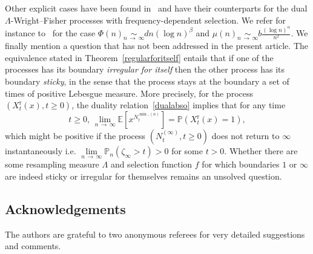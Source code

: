 \documentclass[AHL,Unicode,longabstracts,published]{cedram}
\newcommand{\rmr}{\mathrm{r}}
\newcommand{\bbE}{\mathbb{E}}
\newcommand{\bbP}{\mathbb{P}}
\begin{document}
Other explicit cases have been found in~\cite{explosion} and have their counterparts for the dual $\Lambda$-Wright--Fisher processes with frequency-dependent selection. We refer for instance to~\cite[Theorem~3.11]{explosion} for the case $\Phi(n)\underset{n\,\rightarrow\,\infty}{\sim} d n(\log n)^{\beta}$ and $\mu(n)\underset{n\,\rightarrow\,\infty}{\sim} b \frac{(\log n)^{\alpha}}{n^2}$. We finally mention a question that has not been addressed in the present article. The equivalence stated in Theorem~\ref{regularforitself} entails that if one of the processes has its boundary \emph{irregular for itself} then the other process has its boundary \emph{sticky}, in the sense that the process stays at the boundary a set of times of positive Lebesgue measure. More precisely, for the process $(X_t^{\rmr}(x),t\geq 0)$, the duality relation~\eqref{dualabso} implies that for any time 
\[
t\geq 0,\,\underset{n\,\rightarrow\,\infty}{\lim}\bbE\left[x^{N_t^{\min,(n)}}\right]=\bbP\left(X_t^{\rmr}(x)=1\right),
\]
which might be positive if the process $(N^{(\infty)}_t,t\geq 0)$ does not return to $\infty$ instantaneously i.e. $\underset{n\,\rightarrow\,\infty}{\lim}\bbP_n(\zeta_\infty> t)>0$ for some $t>0$. Whether there are some resampling measure $\Lambda$ and selection function $f$ for which boundaries $1$ or $\infty$ are indeed sticky or irregular for themselves remains an unsolved question. 

\subsection*{Acknowledgements}
The authors are grateful to two anonymous referees for very detailed suggestions and comments.


\end{document}
